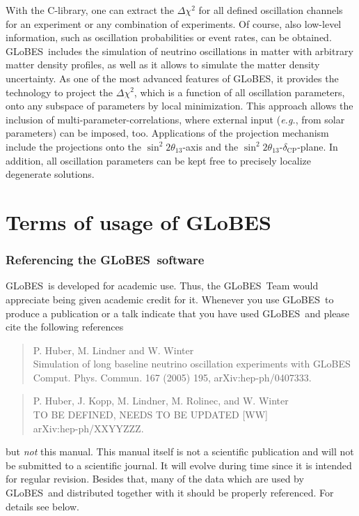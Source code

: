 \documentclass[a4paper,12pt,twoside]{book}
\newcommand{\glbxxx}{hep-ph/0407333}
\newcommand{\glbxxxtwo}{hep-ph/XXYYZZZ}
\newcommand{\deltacp}{\delta_{\mathrm{CP}}}
\newcommand{\stheta}{\sin^2 2 \theta_{13}}
\newcommand{\eg}{{\it e.g.}}
\newcommand{\GLOBES}{{\sf GLoBES}}
\begin{document}
With the C-library, one can extract the $\Delta \chi^2$ for all defined 
oscillation channels for an experiment or any combination of experiments.
Of course, also low-level information, such as oscillation
probabilities or event rates, can be obtained. \GLOBES\ includes the
simulation of neutrino oscillations in matter with arbitrary matter 
density profiles, as well as it allows to simulate the matter density
uncertainty. As one of the most
advanced features of \GLOBES , it provides the technology to 
project the $\Delta \chi^2$, which is a function of all oscillation
parameters, onto any subspace of parameters by local minimization. 
This approach allows the inclusion of multi-parameter-correlations,
where external input (\eg, from solar parameters) can be imposed, too.
Applications of the projection mechanism include the projections onto the $\stheta$-axis and the $\stheta$-$\deltacp$-plane. In addition, all oscillation parameters can be kept free to precisely localize 
degenerate solutions.

\chapter*{Terms of usage of \GLOBES}

\subsection*{Referencing the \GLOBES\ software}

\GLOBES\ is developed for academic use. Thus, the \GLOBES\ Team would
appreciate being given academic credit for it. Whenever you use \GLOBES\
to produce a publication or a talk indicate that you have used \GLOBES\ and
please cite the following references~\cite{globes_paper,globes_paper_two}
\begin{quote}
P. Huber, M. Lindner and W. Winter\\
Simulation of long baseline neutrino oscillation experiments with \GLOBES\\
Comput. Phys. Commun. 167 (2005) 195, arXiv:\glbxxx.   
\end{quote}

\begin{quote}
P. Huber, J. Kopp, M. Lindner, M. Rolinec, and W. Winter\\
TO BE DEFINED, NEEDS TO BE UPDATED [WW]\\
arXiv:\glbxxxtwo.   
\end{quote}
but \emph{not} this manual. This manual itself is not a scientific 
publication and will not be submitted to a scientific journal. 
It will evolve during time since it is intended for 
regular revision. Besides that, many of the data which are used by \GLOBES\ 
and distributed together with it should be properly referenced. 
For details see below.
\end{document}

